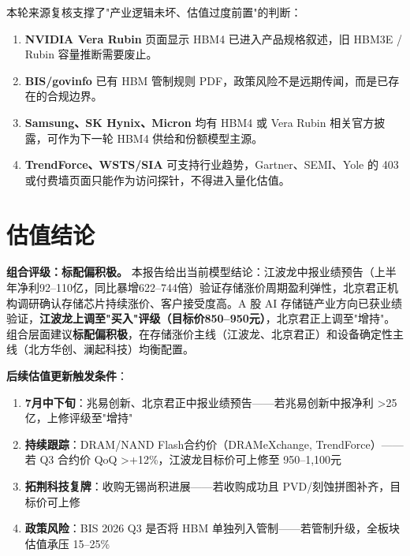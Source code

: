 本轮来源复核支撑了"产业逻辑未坏、估值过度前置"的判断：

\begin{enumerate}[label=(\arabic*)]
  \item \textbf{NVIDIA Vera Rubin} 页面显示 HBM4 已进入产品规格叙述，旧 HBM3E / Rubin 容量推断需要废止。
  \item \textbf{BIS/govinfo} 已有 HBM 管制规则 PDF，政策风险不是远期传闻，而是已存在的合规边界。
  \item \textbf{Samsung、SK Hynix、Micron} 均有 HBM4 或 Vera Rubin 相关官方披露，可作为下一轮 HBM4 供给和份额模型主源。
  \item \textbf{TrendForce、WSTS/SIA} 可支持行业趋势，Gartner、SEMI、Yole 的 403 或付费墙页面只能作为访问探针，不得进入量化估值。
\end{enumerate}

\section{估值结论}

\textbf{组合评级：标配偏积极。} 本报告给出当前模型结论：江波龙中报业绩预告（上半年净利92--110亿，同比暴增622--744倍）验证存储涨价周期盈利弹性，北京君正机构调研确认存储芯片持续涨价、客户接受度高。A 股 AI 存储链产业方向已获业绩验证，\textbf{江波龙上调至"买入"评级（目标价850--950元）}，北京君正上调至"增持"。组合层面建议\textbf{标配偏积极}，在存储涨价主线（江波龙、北京君正）和设备确定性主线（北方华创、澜起科技）均衡配置。\par

\vspace{0.4em}
\noindent\textbf{后续估值更新触发条件}：
\begin{enumerate}[label=\protect\gmark]
  \item \textbf{7月中下旬}：兆易创新、北京君正中报业绩预告——若兆易创新中报净利 >25亿，上修评级至"增持"
  \item \textbf{持续跟踪}：DRAM/NAND Flash合约价（DRAMeXchange, TrendForce）——若 Q3 合约价 QoQ >+12\%，江波龙目标价可上修至 950--1,100元
  \item \textbf{拓荆科技复牌}：收购无锡尚积进展——若收购成功且 PVD/刻蚀拼图补齐，目标价可上修
  \item \textbf{政策风险}：BIS 2026 Q3 是否将 HBM 单独列入管制——若管制升级，全板块估值承压 15--25\%
\end{enumerate}
